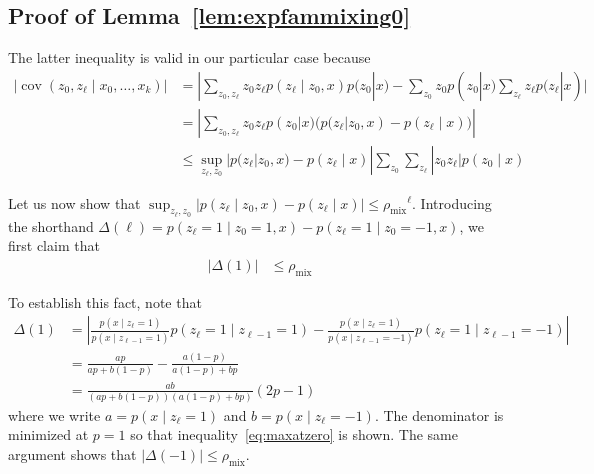 \documentclass[twoside,11pt]{article}
\DeclareMathOperator{\cov}{cov}
\newcommand{\mixcoef}{\ensuremath{\rho_{\mathrm{mix}}}}
\begin{document}

\subsection{Proof of Lemma~\ref{lem:expfammixing0}}
\label{sec:expfammixing}



The latter inequality is valid in our particular case because
\begin{align*}
|\cov (z_0, z_{\ell} \mid x_0,\dots, x_k)| &= |\sum_{z_0, z_{\ell}}
z_0 z_{\ell} p(z_{\ell} \mid z_0,x) p(z_0|x) - \sum_{z_0} z_0 p(z_0|x)
\sum_{z_{\ell}} z_{\ell} p(z_{\ell}|x)| \\
%
&= | \sum_{z_0, z_{\ell}} z_0 z_{\ell} p(z_0|x) (p(z_{\ell}|z_0,x) -
p(z_{\ell} \mid x))| \\ 
%
& \leq \sup_{z_{\ell},z_0} |p(z_{\ell}|z_0,x) - p(z_{\ell} \mid x)|
\sum_{z_0} \sum_{z_{\ell}} |z_0 z_{\ell}| p(z_0 \mid x)
\end{align*}

Let us now show that $\sup_{z_{\ell},z_0} \big| p(z_{\ell} \mid z_0,x)
- p(z_{\ell} \mid x) \big| \leq \mixcoef^{\ell}$.  Introducing the
shorthand $\Delta(\ell) = p(z_{\ell} = 1 \mid z_{0} = 1, x) -
p(z_{\ell} = 1 \mid z_0 =-1, x)$, we first claim that
\begin{align}
\label{eq:maxatzero} 
|\Delta(1)| & \leq \mixcoef
\end{align}

To establish this fact, note that 
\begin{align*}
\Delta(1) & = \left| \frac{p(x \mid z_{\ell} =1) }{p(x
  \mid z_{\ell-1}=1)} p(z_{\ell} =1 \mid z_{\ell-1}=1) -
\frac{p(x \mid z_{\ell}=1)}{p(x \mid z_{\ell-1}= -1)}
p(z_{\ell} = 1 \mid z_{\ell-1} = -1) \right| \\
%
& = \frac{ap}{ap + b(1-p)} -\frac{a(1-p)}{a(1-p)+bp} \\
%
& = \frac{ab}{(ap + b(1-p))(a(1-p)+bp)} (2p-1)
\end{align*}
where we write $a = p( x \mid z_{\ell}=1)$ and $b = p(x \mid z_{\ell}= -1)$.
The denominator is minimized at $p=1$ so that
inequality~\eqref{eq:maxatzero} is shown.  The same argument shows
that $|\Delta(-1)| \leq \mixcoef$.
\end{document}
